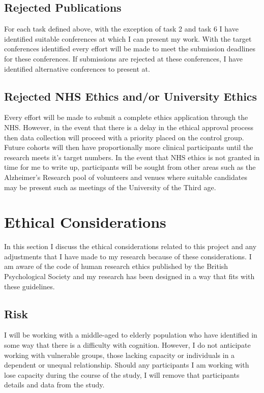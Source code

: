 \documentclass[10pt, letterpaper, twoside, openany]{book}
\begin{document}
\subsection{Rejected Publications}
For each task defined above, with the exception of task 2 and task 6 I have identified suitable conferences at which I can present my work. With the target conferences identified every effort will be made to meet the submission deadlines for these conferences. If submissions are rejected at these conferences, I have identified alternative conferences to present at. 
\subsection{Rejected NHS Ethics and/or University Ethics}
Every effort will be made to submit a complete ethics application through the NHS. However, in the event that there is a delay in the ethical approval process then data collection will proceed with a priority placed on the control group. Future cohorts will then have proportionally more clinical participants until the research meets it's target numbers. In the event that NHS ethics is not granted in time for me to write up, participants will be sought from other areas such as the Alzheimer's Research pool of volunteers and venues where suitable candidates may be present such as meetings of the University of the Third age.   

\section{Ethical Considerations}
In this section I discuss the ethical considerations related to this project and any adjustments that I have made to my research because of these considerations. I am aware of the code of human  research ethics published by the British Psychological Society \cite{BritishPsychologicalSociety2014} and my research has been designed in a way that fits with these guidelines.
\subsection{Risk}
I will be working with a middle-aged to elderly population who have identified in some way that there is a difficulty with cognition. However, I do not anticipate working with vulnerable groups, those lacking capacity or individuals in a dependent or unequal relationship. Should any participants I am working with lose capacity during the course of the study, I will remove that participants details and data from the study.
\end{document}
